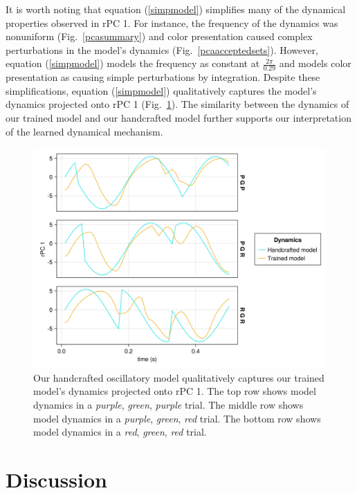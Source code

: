 \documentclass[conference]{IEEEtran}
\begin{document}
It is worth noting that equation (\ref{simpmodel}) simplifies many of the dynamical properties observed in rPC 1. For instance, the frequency of the dynamics was nonuniform (Fig.~\ref{pcasummary}) and color presentation caused complex perturbations in the model’s dynamics (Fig.~\ref{pcaacceptedsets}). However, equation (\ref{simpmodel}) models the frequency as constant at $\frac{2\pi}{0.29}$ and models color presentation as causing simple perturbations by integration. Despite these simplifications, equation (\ref{simpmodel}) qualitatively captures the model’s dynamics projected onto rPC 1 (Fig.~\ref{constructedmodel}). The similarity between the dynamics of our trained model and our handcrafted model further supports our interpretation of the learned dynamical mechanism.

\begin{figure}[htbp]
\centerline{\includegraphics[scale=0.10]{constructed_phase_angle_computation.png}}
\caption{Our handcrafted oscillatory model qualitatively captures our trained model’s dynamics projected onto rPC 1. The top row shows model dynamics in a \textit{purple}, \textit{green}, \textit{purple} trial. The middle row shows model dynamics in a \textit{purple}, \textit{green}, \textit{red} trial. The bottom row shows model dynamics in a \textit{red}, \textit{green}, \textit{red} trial.}
\label{constructedmodel}
\end{figure}

\section{Discussion}
\end{document}
